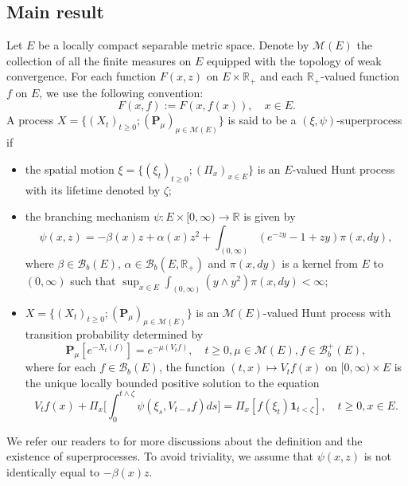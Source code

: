 \documentclass[UTF8]{pkuthss}
\theoremstyle{plain}
\theoremstyle{definition}
\numberwithin{equation}{section}
\begin{document}
\subsection{Main result}
	
    Let $E$ be a locally compact separable metric space. Denote by $\mathcal M(E)$ the collection of all the finite measures on $E$ equipped with the topology of weak convergence.
    For each function $F(x,z)$ on $E\times \mathbb R_+$ and each $\mathbb R_+$-valued function $f$ on $E$, we use the following convention:
\[
    F(x,f):= F(x,f(x)),\quad x\in E.
\]
    A process $X=\{(X_t)_{t\geq 0}; (\mathbf P_\mu)_{\mu \in \mathcal M(E)}\}$ is said to be a $(\xi,\psi)$-superprocess if
\begin{itemize}
\item
    the spatial motion $\xi=\{(\xi_t)_{t\geq 0};(\Pi_x)_{x\in E}\}$ is an $E$-valued Hunt process with its lifetime denoted by $\zeta$;
\item
    the branching mechanism $\psi: E\times[0,\infty) \to \mathbb R$ is given by
\begin{equation}
    \psi(x,z)=
    -\beta(x) z + \alpha (x) z^2 + \int_{(0,\infty)} (e^{-zy} - 1 + zy) \pi(x,dy),
\end{equation}
    where $\beta \in \mathcal B_b(E)$, $\alpha \in \mathcal B_b(E, \mathbb R_+)$ and $\pi(x,dy)$ is a kernel from $E$ to $(0,\infty)$ such that $\sup_{x\in E} \int_{(0,\infty)} (y\wedge y^2) \pi(x,dy) < \infty$;
\item
    $X=\{(X_t)_{t\geq 0}; (\mathbf P_\mu)_{\mu \in \mathcal M(E)}\}$ is an $\mathcal M(E)$-valued Hunt process with transition probability determined by
\begin{equation}
    \mathbf P_\mu [e^{-X_t(f)}] = e^{-\mu(V_tf)},
    \quad t\geq 0, \mu \in \mathcal M(E), f\in \mathcal B^+_b(E),
\end{equation}
    where for each $f\in \mathcal B_b(E)$, the function $(t,x)\mapsto V_tf(x)$ on $[0,\infty) \times E$ is the unique locally bounded positive solution to the equation
\begin{equation}
    V_tf(x) + \Pi_x \Big[  \int_0^{t\wedge \zeta} \psi(\xi_s,V_{t-s}f)ds \Big]
    = \Pi_x [ f(\xi_t)\mathbf 1_{t<\zeta} ],
    \quad t \geq 0, x \in E.
\end{equation}
\end{itemize}
    We refer our readers to \cite{Li2011MeasureValued} for more discussions about the definition and the existence of superprocesses.
    To avoid triviality, we assume that
    $\psi(x,z)$ is not identically equal to $-\beta(x)z$.
\end{document}
